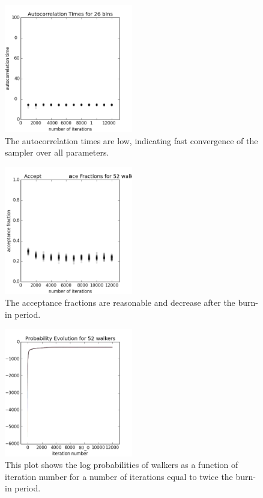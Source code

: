 \documentclass[preprint]{aastex}
\begin{document}
\begin{figure}
\includegraphics[width=0.5\textwidth]{times-toy.png}
\caption{The autocorrelation times are low, indicating fast convergence of the sampler over all parameters.}
\label{fig:dumbestacor}
\end{figure}

\begin{figure}
\includegraphics[width=0.5\textwidth]{fracs-toy.png}
\caption{The acceptance fractions are reasonable and decrease after the burn-in period.}
\label{fig:dumbestfrac}
\end{figure}

\begin{figure}
\includegraphics[width=0.5\textwidth]{probs-toy.png}
\caption{This plot shows the log probabilities of walkers as a function of iteration number for a number of iterations equal to twice the burn-in period.}
\label{fig:dumbestprob}
\end{figure}
\end{document}
